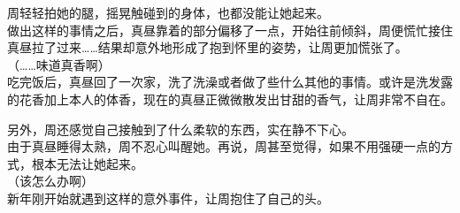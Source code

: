 周轻轻拍她的腿，摇晃触碰到的身体，也都没能让她起来。\\

做出这样的事情之后，真昼靠着的部分偏移了一点，开始往前倾斜，周便慌忙接住真昼拉了过来……结果却意外地形成了抱到怀里的姿势，让周更加慌张了。\\

（……味道真香啊）\\

吃完饭后，真昼回了一次家，洗了洗澡或者做了些什么其他的事情。或许是洗发露的花香加上本人的体香，现在的真昼正微微散发出甘甜的香气，让周非常不自在。

另外，周还感觉自己接触到了什么柔软的东西，实在静不下心。\\

由于真昼睡得太熟，周不忍心叫醒她。再说，周甚至觉得，如果不用强硬一点的方式，根本无法让她起来。\\

（该怎么办啊）\\

新年刚开始就遇到这样的意外事件，让周抱住了自己的头。
